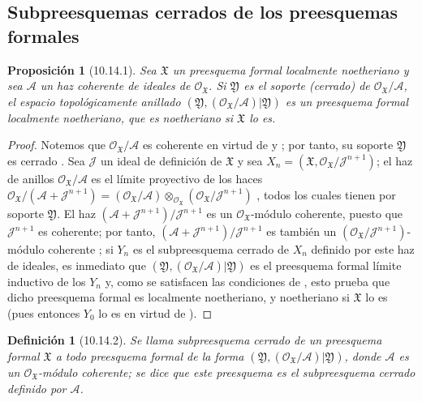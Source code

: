 \documentclass[oneside]{amsart}
\theoremstyle{ega-env-style}
\theoremstyle{ega-thm-env-style}
\newtheorem*{proposition}{Proposición}
\theoremstyle{ega-defn-env-style}
\newtheorem*{definition}{Definición}
\newcommand{\oldpage}[2][]{{\marginnote{\normalfont{\textbf{#1}~|~#2}}}\ignorespaces}
\let\EGAOriginalLabel\label
\renewcommand{\label}[1]{\phantomsection\EGAOriginalLabel{#1}}
\begin{document}
\subsection{Subpreesquemas cerrados de los preesquemas formales}
\label{subsection:I.10.14}

\begin{proposition}[10.14.1]
\label{I.10.14.1}
Sea $\mathfrak{X}$ un preesquema formal localmente noetheriano y sea $\mathscr{A}$ un haz coherente de ideales de $\mathscr{O}_{\mathfrak{X}}$.
Si $\mathfrak{Y}$ es el soporte (cerrado) de $\mathscr{O}_{\mathfrak{X}}/\mathscr{A}$, el espacio topológicamente anillado $(\mathfrak{Y},(\mathscr{O}_{\mathfrak{X}}/\mathscr{A})|\mathfrak{Y})$ es un preesquema formal localmente noetheriano, que es noetheriano si $\mathfrak{X}$ lo es.
\end{proposition}

\begin{proof}
Notemos que $\mathscr{O}_{\mathfrak{X}}/\mathscr{A}$ es coherente en virtud de  y ; por tanto, su soporte $\mathfrak{Y}$ es cerrado .
Sea $\mathscr{J}$ un ideal de definición de $\mathfrak{X}$ y sea $X_n=(\mathfrak{X},\mathscr{O}_{\mathfrak{X}}/\mathscr{J}^{n+1})$;
el haz de anillos $\mathscr{O}_{\mathfrak{X}}/\mathscr{A}$ es el límite proyectivo de los haces $\mathscr{O}_{\mathfrak{X}}/(\mathscr{A}+\mathscr{J}^{n+1})
=(\mathscr{O}_{\mathfrak{X}}/\mathscr{A})
\otimes_{\mathscr{O}_{\mathfrak{X}}}
(\mathscr{O}_{\mathfrak{X}}/\mathscr{J}^{n+1})$ , todos los cuales tienen por soporte $\mathfrak{Y}$.
El haz $(\mathscr{A}+\mathscr{J}^{n+1})/\mathscr{J}^{n+1}$ es un $\mathscr{O}_{\mathfrak{X}}$-módulo coherente, puesto que $\mathscr{J}^{n+1}$ es coherente; por tanto, $(\mathscr{A}+\mathscr{J}^{n+1})/\mathscr{J}^{n+1}$ es también un $(\mathscr{O}_{\mathfrak{X}}/\mathscr{J}^{n+1})$-módulo coherente ;
si $Y_n$ es el subpreesquema cerrado de $X_n$ definido por este haz de ideales, es inmediato que $(\mathfrak{Y},(\mathscr{O}_{\mathfrak{X}}/\mathscr{A})|\mathfrak{Y})$
\oldpage[I]{210}
es el preesquema formal límite inductivo de los $Y_n$ y, como se satisfacen las condiciones de , esto prueba que dicho preesquema formal es localmente noetheriano, y noetheriano si $\mathfrak{X}$ lo es (pues entonces $Y_0$ lo es en virtud de ).
\end{proof}

\begin{definition}[10.14.2]
\label{I.10.14.2}
{\itshape Se llama subpreesquema cerrado de un preesquema formal $\mathfrak{X}$ a todo preesquema formal de la forma $(\mathfrak{Y},(\mathscr{O}_{\mathfrak{X}}/\mathscr{A})|\mathfrak{Y})$, donde $\mathscr{A}$ es un $\mathscr{O}_{\mathfrak{X}}$-módulo coherente;
se dice que este preesquema es el subpreesquema cerrado definido por $\mathscr{A}$.}
\end{definition}
\end{document}
